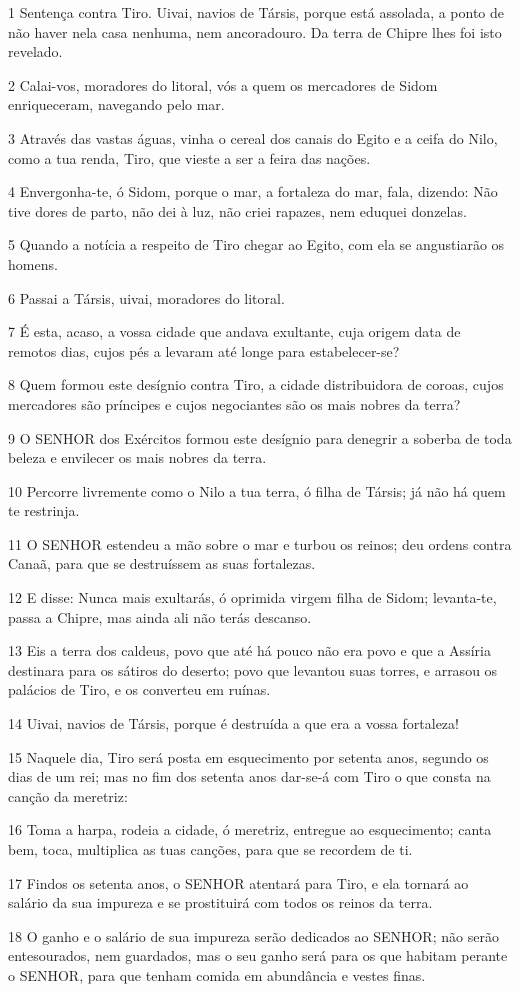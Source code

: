 \par 1 Sentença contra Tiro. Uivai, navios de Társis, porque está assolada, a ponto de não haver nela casa nenhuma, nem ancoradouro. Da terra de Chipre lhes foi isto revelado.
\par 2 Calai-vos, moradores do litoral, vós a quem os mercadores de Sidom enriqueceram, navegando pelo mar.
\par 3 Através das vastas águas, vinha o cereal dos canais do Egito e a ceifa do Nilo, como a tua renda, Tiro, que vieste a ser a feira das nações.
\par 4 Envergonha-te, ó Sidom, porque o mar, a fortaleza do mar, fala, dizendo: Não tive dores de parto, não dei à luz, não criei rapazes, nem eduquei donzelas.
\par 5 Quando a notícia a respeito de Tiro chegar ao Egito, com ela se angustiarão os homens.
\par 6 Passai a Társis, uivai, moradores do litoral.
\par 7 É esta, acaso, a vossa cidade que andava exultante, cuja origem data de remotos dias, cujos pés a levaram até longe para estabelecer-se?
\par 8 Quem formou este desígnio contra Tiro, a cidade distribuidora de coroas, cujos mercadores são príncipes e cujos negociantes são os mais nobres da terra?
\par 9 O SENHOR dos Exércitos formou este desígnio para denegrir a soberba de toda beleza e envilecer os mais nobres da terra.
\par 10 Percorre livremente como o Nilo a tua terra, ó filha de Társis; já não há quem te restrinja.
\par 11 O SENHOR estendeu a mão sobre o mar e turbou os reinos; deu ordens contra Canaã, para que se destruíssem as suas fortalezas.
\par 12 E disse: Nunca mais exultarás, ó oprimida virgem filha de Sidom; levanta-te, passa a Chipre, mas ainda ali não terás descanso.
\par 13 Eis a terra dos caldeus, povo que até há pouco não era povo e que a Assíria destinara para os sátiros do deserto; povo que levantou suas torres, e arrasou os palácios de Tiro, e os converteu em ruínas.
\par 14 Uivai, navios de Társis, porque é destruída a que era a vossa fortaleza!
\par 15 Naquele dia, Tiro será posta em esquecimento por setenta anos, segundo os dias de um rei; mas no fim dos setenta anos dar-se-á com Tiro o que consta na canção da meretriz:
\par 16 Toma a harpa, rodeia a cidade, ó meretriz, entregue ao esquecimento; canta bem, toca, multiplica as tuas canções, para que se recordem de ti.
\par 17 Findos os setenta anos, o SENHOR atentará para Tiro, e ela tornará ao salário da sua impureza e se prostituirá com todos os reinos da terra.
\par 18 O ganho e o salário de sua impureza serão dedicados ao SENHOR; não serão entesourados, nem guardados, mas o seu ganho será para os que habitam perante o SENHOR, para que tenham comida em abundância e vestes finas.

